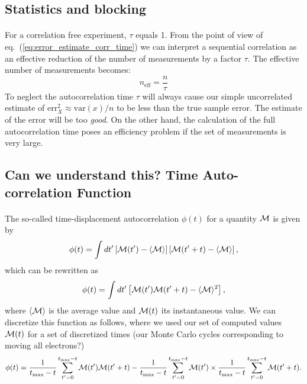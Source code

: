 \documentclass[%
twoside,                 %
final,                   %
10pt]{article}
\begin{document}
\subsection*{Statistics and blocking}

\paragraph{}
For a correlation free experiment, $\tau$
equals 1. From the point of view of
eq.~(\ref{eq:error_estimate_corr_time}) we can interpret a sequential
correlation as an effective reduction of the number of measurements by
a factor $\tau$. The effective number of measurements becomes:
\[
n_\mathrm{eff} = \frac{n}{\tau}
\]
To neglect the autocorrelation time $\tau$ will always cause our
simple uncorrelated estimate of $\mathrm{err}_X^2\approx \mathrm{var}(x)/n$ to
be less than the true sample error. The estimate of the error will be
too \emph{good}. On the other hand, the calculation of the full
autocorrelation time poses an efficiency problem if the set of
measurements is very large.







\subsection*{Can we understand this? Time Auto-correlation Function}

\paragraph{}
The so-called time-displacement autocorrelation $\phi(t)$ for a quantity ${\cal M}$ is given by
\[
\phi(t) = \int dt' \left[{\cal M}(t')-\langle {\cal M} \rangle\right]\left[{\cal M}(t'+t)-\langle {\cal M} \rangle\right],
\]
which can be rewritten as 
\[
\phi(t) = \int dt' \left[{\cal M}(t'){\cal M}(t'+t)-\langle {\cal M} \rangle^2\right],
\]
where $\langle {\cal M} \rangle$ is the average value and
${\cal M}(t)$ its instantaneous value. We can discretize this function as follows, where we used our
set of computed values ${\cal M}(t)$ for a set of discretized times (our Monte Carlo cycles corresponding to moving all electrons?)
\[
\phi(t)  = \frac{1}{t_{\mathrm{max}}-t}\sum_{t'=0}^{t_{\mathrm{max}}-t}{\cal M}(t'){\cal M}(t'+t)
-\frac{1}{t_{\mathrm{max}}-t}\sum_{t'=0}^{t_{\mathrm{max}}-t}{\cal M}(t')\times
\frac{1}{t_{\mathrm{max}}-t}\sum_{t'=0}^{t_{\mathrm{max}}-t}{\cal M}(t'+t).
\label{eq:phitf}
\]
\end{document}

